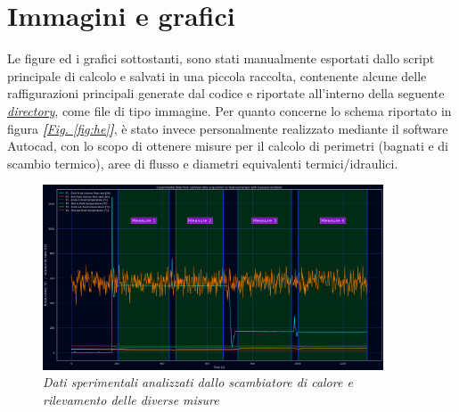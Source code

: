 \documentclass[a4paper,10pt]{article}                                                                                       %
\begin{document}
\section{Immagini e grafici}                                                                                                %
  Le figure ed i grafici sottostanti, sono stati manualmente esportati dallo script principale di calcolo e salvati in una
  piccola raccolta, contenente alcune delle raffigurazioni principali generate dal codice e riportate all'interno della
  seguente \textit{\href{https://github.com/CristianMerli/DataAnalysis/tree/master/final_doc/code_exports/imgs}{directory}},
  come file di tipo immagine. Per quanto concerne lo schema riportato in figura
  \textit{\textbf{[}\hyperref[fig:he]{Fig. }\ref{fig:he}\textbf{]}}, è stato invece personalmente realizzato mediante il
  software Autocad, con lo scopo di ottenere misure per il calcolo di perimetri (bagnati e di scambio termico), aree di
  flusso e diametri equivalenti termici/idraulici.
\label{sec:imgs_graphs}                                                                                                     %
\begin{figure}[H]                                                                                                           %
  \centering                                                                                                                %
  \includegraphics[width=0.9\textwidth]{../final_doc/code_exports/imgs/measures.png}                                        %
  \caption{\textit{Dati sperimentali analizzati dallo scambiatore di calore e rilevamento delle diverse misure}}            %
  \label{fig:measures}                                                                                                      %
\end{figure}                                                                                                                %
\end{document}
